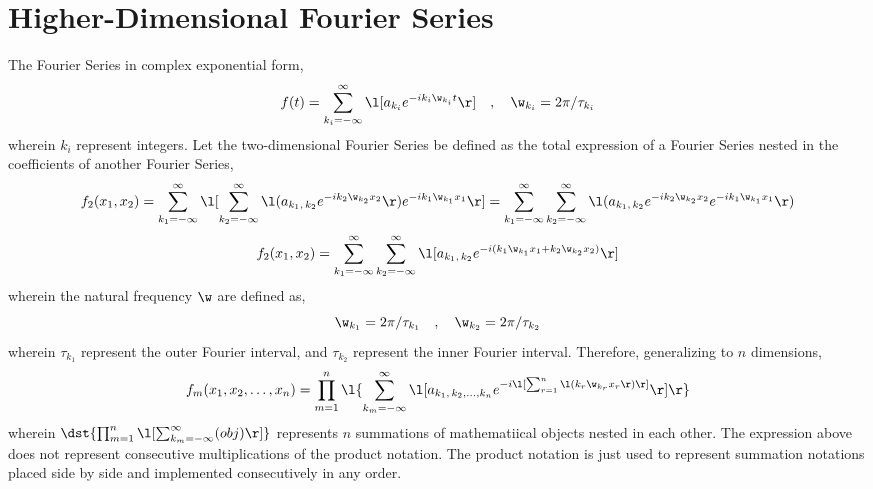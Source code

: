 \section{Higher-Dimensional Fourier Series}
\begin{comment}
\end{comment}
The Fourier Series in complex exponential form,
$$f(t) = \sum^{\infty}_{k_i = -\infty}\l[a_{k_i}e^{-ik_i\w_{k_i}t}\r]\quad,\quad \w_{k_i} = 2\pi/\tau_{k_i}$$
wherein $k_i$ represent integers. Let the two-dimensional Fourier Series be defined as the total expression of a Fourier Series nested in the coefficients of another Fourier Series,
$$f_2(x_1,x_2) = \sum^{\infty}_{k_1 = -\infty}\l[\sum^{\infty}_{k_2 = -\infty}\l(a_{k_1,\,k_2}e^{-ik_2\w_{k_2}x_2}\r)e^{-ik_1\w_{k_1}x_1}\r] = \sum^{\infty}_{k_1 = -\infty}\sum^{\infty}_{k_2 = -\infty}\l(a_{k_1,\,k_2}e^{-ik_2\w_{k_2}x_2}e^{-ik_1\w_{k_1}x_1}\r)$$
$$f_2(x_1,x_2) = \sum^{\infty}_{k_1 = -\infty}\sum^{\infty}_{k_2 = -\infty}\l[a_{k_1,\,k_2}e^{-i(k_1\w_{k_1}x_1+k_2\w_{k_2}x_2)}\r]$$
wherein the natural frequency $\w$ are defined as,
$$\w_{k_1} = 2\pi/\tau_{k_1} \quad,\quad \w_{k_2} = 2\pi/\tau_{k_2}$$
wherein $\tau_{k_1}$ represent the outer Fourier interval, and $\tau_{k_2}$ represent the inner Fourier interval. Therefore, generalizing to $n$ dimensions,
$$f_m(x_1,x_2,\dots,x_n) = \prod^{n}_{m=1}\l\{\sum^{\infty}_{k_m = -\infty}\l[a_{k_1,\,k_2,\dots,k_n}e^{-i\l[\sum^{n}_{r=1}\l(k_r\w_{k_r}x_r\r)\r]}\r]\r\}$$
wherein $\dst{\prod^{n}_{m=1}\l[\sum^{\infty}_{k_m = -\infty}(obj)\r]}$ represents $n$ summations of mathematiical objects nested in each other. The expression above does not represent consecutive multiplications of the product notation. The product notation is just used to represent summation notations placed side by side and implemented consecutively in any order. 
